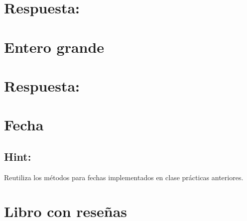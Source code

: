 \ifshowanswers
\section*{Respuesta:}

\fi

\section{Entero grande}


\ifshowanswers
\section*{Respuesta:}

\fi

\section{Fecha}


\ifshowanswers
\subsection*{Hint:}
Reutiliza los métodos para fechas implementados en clase prácticas anteriores.
\fi

\section{Libro con reseñas}


% 

% 

% 
